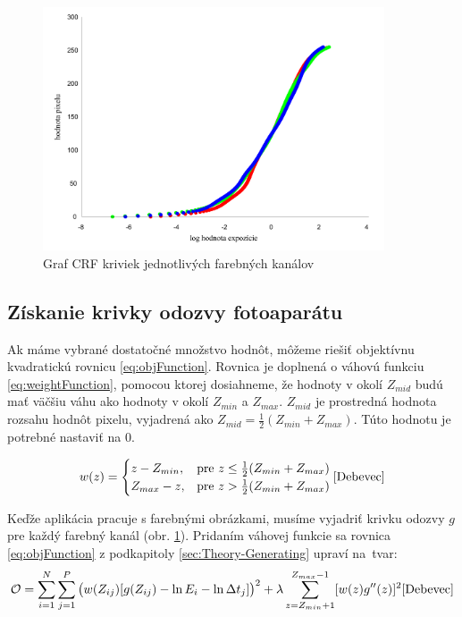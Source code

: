 \begin{figure}[t]
  \centering
  \includegraphics[width=0.9\textwidth]{figures/generating/octave-crf}
  \caption{Graf CRF kriviek jednotlivých farebných kanálov}
  \label{fig:octave_crf}
\end{figure}

\subsection{Získanie krivky odozvy fotoaparátu}

Ak máme vybrané dostatočné množstvo hodnôt, môžeme riešiť objektívnu kvadratickú rovnicu \ref{eq:objFunction}.
Rovnica je doplnená o váhovú funkciu \ref{eq:weightFunction}, pomocou ktorej dosiahneme, že hodnoty v okolí
$Z_{mid}$ budú mať väčšiu váhu ako hodnoty v okolí $Z_{min}$ a $Z_{max}$. $Z_{mid}$ je prostredná hodnota rozsahu
hodnôt pixelu, vyjadrená ako $Z_{mid} = \frac{1}{2}(Z_{min} + Z_{max})$. Túto hodnotu je potrebné nastaviť na 0.

\begin{equation} \label{eq:weightFunction}
  w(z)=
  \begin{cases}
    z - Z_{min}, & \text{pre}\ z \leq \frac{1}{2}(Z_{min} + Z_{max}) \\
    Z_{max} - z, & \text{pre}\ z > \frac{1}{2}(Z_{min} + Z_{max})
  \end{cases}
  \cite{Debevec}
\end{equation}

Keďže aplikácia pracuje s farebnými obrázkami, musíme vyjadriť krivku odozvy $g$ pre každý farebný kanál (obr. \ref{fig:octave_crf}).
Pridaním váhovej funkcie sa rovnica \ref{eq:objFunction} z podkapitoly \ref{sec:Theory-Generating} upraví na~tvar:
\begin{equation} \label{eq:rrFunction}
        \mathcal{O} = 
        \sum_{i=1}^{N}
        \sum_{j=1}^{P}
        \big (w(Z_{ij})[g(Z_{ij}) - \ln E_{i} - \ln \Delta t_{j}] \big )^{2}
        + \lambda
        \sum_{z=Z_{min} + 1}^{Z_{max} - 1}
        [w(z) g''(z)]^{2}
        \cite{Debevec}
\end{equation} 

